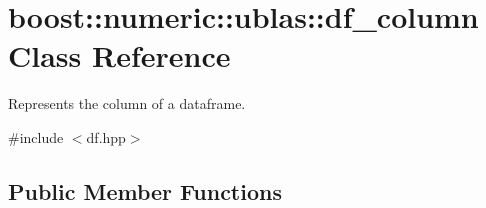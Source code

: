 \hypertarget{classboost_1_1numeric_1_1ublas_1_1df__column}{}\section{boost\+:\+:numeric\+:\+:ublas\+:\+:df\+\_\+column Class Reference}
\label{classboost_1_1numeric_1_1ublas_1_1df__column}


Represents the column of a dataframe.  




{\ttfamily \#include $<$df.\+hpp$>$}

\subsection*{Public Member Functions}
